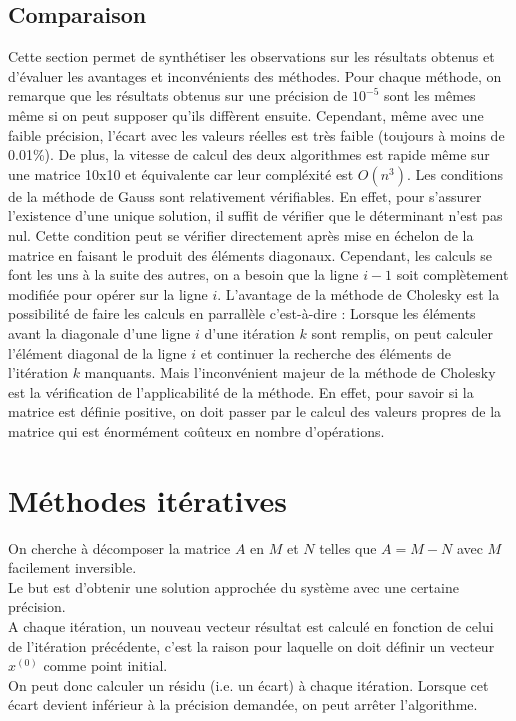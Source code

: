 \documentclass{report}
\begin{document}
    \section{Comparaison}
    Cette section permet de synthétiser les observations sur les résultats obtenus et d'évaluer les avantages et inconvénients des méthodes.
    Pour chaque méthode, on remarque que les résultats obtenus sur une précision de $10^{-5}$ sont les mêmes même si on peut supposer qu'ils diffèrent ensuite.
    Cependant, même avec une faible précision, l'écart avec les valeurs réelles est très faible (toujours à moins de 0.01\%).
    De plus, la vitesse de calcul des deux algorithmes est rapide même sur une matrice 10x10 et équivalente car leur compléxité est $O(n^3)$.
    \newline 
    Les conditions de la méthode de Gauss sont relativement vérifiables. En effet, pour s'assurer l'existence d'une unique solution, il suffit de vérifier que le déterminant n'est pas nul.
    Cette condition peut se vérifier directement après mise en échelon de la matrice en faisant le produit des éléments diagonaux.
    \newline
    Cependant, les calculs se font les uns à la suite des autres, on a besoin que la ligne $i-1$ soit complètement modifiée pour opérer sur la ligne $i$.
    \newline
    L'avantage de la méthode de Cholesky est la possibilité de faire les calculs en parrallèle c'est-à-dire :
    Lorsque les éléments avant la diagonale d'une ligne $i$ d'une itération $k$ sont remplis, on peut calculer l'élément diagonal de la ligne $i$ et continuer la recherche des éléments de l'itération $k$ manquants.
    Mais l'inconvénient majeur de la méthode de Cholesky est la vérification de  l'applicabilité de la méthode. En effet, pour savoir si la matrice est définie positive, on doit passer par le calcul
    des valeurs propres de la matrice qui est énormément coûteux en nombre d'opérations.
    
     
  \chapter{Méthodes itératives}
      On cherche à décomposer la matrice $A$ en $M$ et $N$ telles que $A = M-N$ avec $M$ facilement inversible.\\
      
      Le but est d'obtenir une solution approchée du système avec une certaine précision.\\
      A chaque itération, un nouveau vecteur résultat est calculé en fonction de celui de l'itération précédente, c'est la raison pour laquelle on doit définir un vecteur $x^{(0)}$ comme point initial.\\
      On peut donc calculer un résidu (i.e. un écart) à chaque itération. Lorsque cet écart devient inférieur à la précision demandée, on peut arrêter l'algorithme.
      
\end{document}
